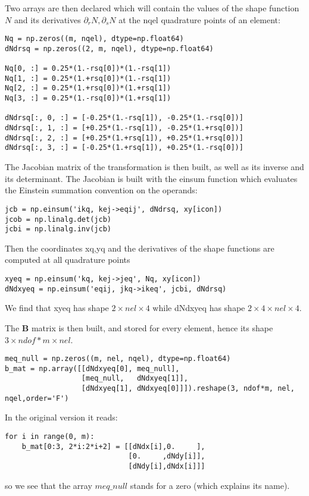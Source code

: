 Two arrays are then declared which will contain the values of the shape function $N$
and its derivatives $\partial_r N,\partial_s N$ at the nqel quadrature points of an element:
\begin{lstlisting}
Nq = np.zeros((m, nqel), dtype=np.float64)        
dNdrsq = np.zeros((2, m, nqel), dtype=np.float64)

Nq[0, :] = 0.25*(1.-rsq[0])*(1.-rsq[1])
Nq[1, :] = 0.25*(1.+rsq[0])*(1.-rsq[1])
Nq[2, :] = 0.25*(1.+rsq[0])*(1.+rsq[1])
Nq[3, :] = 0.25*(1.-rsq[0])*(1.+rsq[1])

dNdrsq[:, 0, :] = [-0.25*(1.-rsq[1]), -0.25*(1.-rsq[0])]
dNdrsq[:, 1, :] = [+0.25*(1.-rsq[1]), -0.25*(1.+rsq[0])]
dNdrsq[:, 2, :] = [+0.25*(1.+rsq[1]), +0.25*(1.+rsq[0])]
dNdrsq[:, 3, :] = [-0.25*(1.+rsq[1]), +0.25*(1.-rsq[0])]
\end{lstlisting}


The Jacobian matrix of the transformation is then built,
as well as its inverse and its determinant. 
The Jacobian is built with the einsum function which
evaluates the Einstein summation convention on the operands:
\begin{lstlisting}
jcb = np.einsum('ikq, kej->eqij', dNdrsq, xy[icon])
jcob = np.linalg.det(jcb)
jcbi = np.linalg.inv(jcb)
\end{lstlisting}


Then the coordinates xq,yq and the derivatives of the shape functions 
are computed at all quadrature points 

\begin{lstlisting}
xyeq = np.einsum('kq, kej->jeq', Nq, xy[icon])
dNdxyeq = np.einsum('eqij, jkq->ikeq', jcbi, dNdrsq)
\end{lstlisting}
We find that xyeq has shape $2\times nel \times 4$
while dNdxyeq has shape $2\times 4\times nel\times 4$.

The ${\bm B}$ matrix is then built, and stored for every element, 
hence its shape $3 \times ndof*m \times nel$.

\begin{lstlisting}
meq_null = np.zeros((m, nel, nqel), dtype=np.float64)
b_mat = np.array([[dNdxyeq[0], meq_null],
                  [meq_null,   dNdxyeq[1]],
                  [dNdxyeq[1], dNdxyeq[0]]]).reshape(3, ndof*m, nel, nqel,order='F')
\end{lstlisting}
In the original version it reads:
\begin{lstlisting}
for i in range(0, m):
    b_mat[0:3, 2*i:2*i+2] = [[dNdx[i],0.     ],
                             [0.     ,dNdy[i]],
                             [dNdy[i],dNdx[i]]]
\end{lstlisting}
so we see that the array $meq\_null$ stands for a zero (which explains its name).

